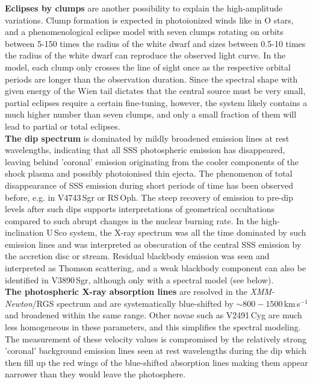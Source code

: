 \documentclass{aa}
\newcommand{\xmm}{{\it XMM-Newton}}
\begin{document}
{\bf Eclipses by clumps} are another possibility to explain the high-amplitude
variations. Clump formation is expected in photoionized winds like in
O stars, and a phenomenological eclipse model with seven clumps rotating
on orbits between 5-150 times the radius of the white dwarf and sizes between
0.5-10 times the radius of the white dwarf can reproduce the observed
light curve. In the model, each clump only crosses the line of sight once
as the respective orbital periods are longer than the observation duration.
Since the spectral shape with given energy of the Wien tail dictates that the
central source must be very small, partial eclipses require a certain
fine-tuning, however, the system likely contains a much higher number
than seven clumps, and only a small fraction of them will lead to
partial or total eclipses.\\

{\bf The dip spectrum} is dominated by mildly broadened emission lines
at rest wavelengths, indicating that
all SSS photospheric emission has disappeared, leaving behind 'coronal'
emission originating from the cooler components of the shock plasma and
possibly photoionised thin ejecta. The phenomenon of total disappearance
of SSS emission during short periods of time has been observed before,
e.g. in V4743\,Sgr or RS\,Oph. The steep recovery of emission to pre-dip
levels after such dips supports interpretations of geometrical occultations
compared to such abrupt changes in the nuclear burning rate. In the high-inclination
U\,Sco system, the X-ray spectrum was all the time dominated by such
emission lines and was interpreted as obscuration of the central SSS emission by
the accretion disc or stream. Residual blackbody emission was seen and
interpreted as Thomson scattering, and a weak blackbody component can
also be identified in V3890\,Sgr, although only with a spectral model
(see below).\\

{\bf The photospheric X-ray absorption lines} are resolved in the \xmm/RGS spectrum and
are systematically blue-shifted by $\sim 800-1500$\,km\,s$^{-1}$ and
broadened within the same range. Other novae such as V2491\,Cyg
are  much less homogeneous in these parameters, and this simplifies
the spectral modeling.\\
The measurement of these velocity
values is compromised by the relatively strong 'coronal' background
emission lines seen at rest wavelengths during the dip which then
fill up the red wings of the blue-shifted absorption lines making them
appear narrower than they would leave the photosphere.\\
\end{document}
